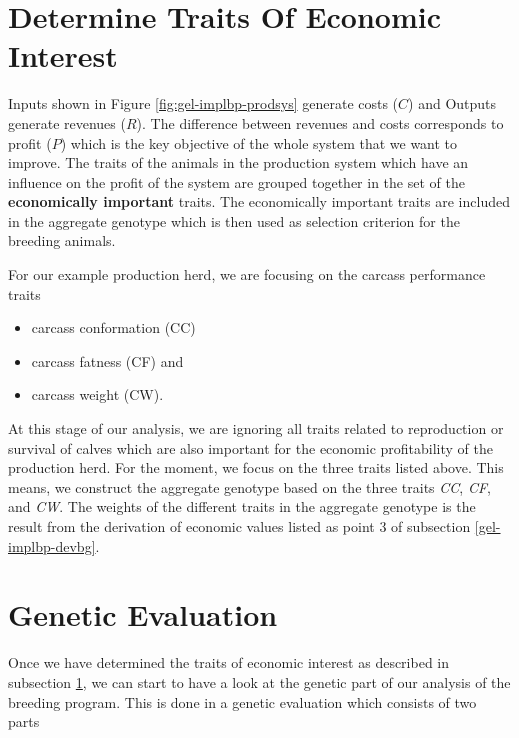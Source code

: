 \documentclass[
]{book}
\providecommand{\tightlist}{%
  \setlength{\itemsep}{0pt}\setlength{\parskip}{0pt}}
\begin{document}
\hypertarget{gel-implbp-dettrint}{%
\section{Determine Traits Of Economic Interest}\label{gel-implbp-dettrint}}

Inputs shown in Figure \ref{fig:gel-implbp-prodsys} generate costs (\(C\)) and Outputs generate revenues (\(R\)). The difference between revenues and costs corresponds to profit (\(P\)) which is the key objective of the whole system that we want to improve. The traits of the animals in the production system which have an influence on the profit of the system are grouped together in the set of the \textbf{economically important} traits. The economically important traits are included in the aggregate genotype which is then used as selection criterion for the breeding animals.

For our example production herd, we are focusing on the carcass performance traits

\begin{itemize}
\tightlist
\item
  carcass conformation (CC)
\item
  carcass fatness (CF) and
\item
  carcass weight (CW).
\end{itemize}

At this stage of our analysis, we are ignoring all traits related to reproduction or survival of calves which are also important for the economic profitability of the production herd. For the moment, we focus on the three traits listed above. This means, we construct the aggregate genotype based on the three traits \emph{CC}, \emph{CF}, and \emph{CW}. The weights of the different traits in the aggregate genotype is the result from the derivation of economic values listed as point 3 of subsection \ref{gel-implbp-devbg}.

\hypertarget{gel-implbp-geneval}{%
\section{Genetic Evaluation}\label{gel-implbp-geneval}}

Once we have determined the traits of economic interest as described in subsection \ref{gel-implbp-dettrint}, we can start to have a look at the genetic part of our analysis of the breeding program. This is done in a genetic evaluation which consists of two parts
\end{document}
